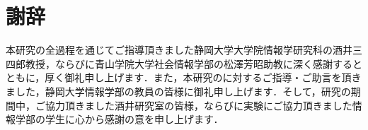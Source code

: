 \chapter*{謝辞}

本研究の全過程を通じてご指導頂きました静岡大学大学院情報学研究科の酒井三四郎教授，ならびに青山学院大学社会情報学部の松澤芳昭助教に深く感謝するとともに，厚く御礼申し上げます．また，本研究のに対するご指導・ご助言を頂きました，静岡大学情報学部の教員の皆様に御礼申し上げます．そして，研究の期間中，ご協力頂きました酒井研究室の皆様，ならびに実験にご協力頂きました情報学部の学生に心から感謝の意を申し上げます．